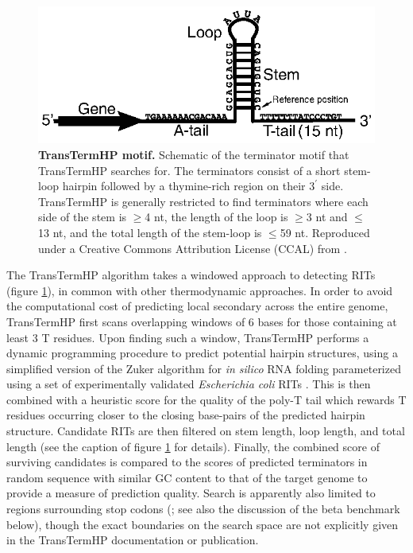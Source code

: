 \begin{figure}[htp]
\begin{center}
\includegraphics[width=14cm]{transterm}
\caption[TransTermHP motif]{\textbf{TransTermHP motif.} Schematic of the terminator motif that TransTermHP searches for. The terminators consist of a short stem-loop hairpin followed by a thymine-rich region on their $3^\prime$ side. TransTermHP is generally restricted to find terminators where each side of the stem is $\ge$4 nt, the length of the loop is $\ge$3 nt and $\le$13 nt, and the total length of the stem-loop is $\le$59 nt. Reproduced under a Creative Commons Attribution License (CCAL) from \textcite{Kingsford2007}.
} 
\label{fig:transterm}
\end{center}
\end{figure}

The TransTermHP algorithm takes a windowed approach to detecting RITs (figure \ref{fig:transterm}), in common with other thermodynamic approaches. In order to avoid the computational cost of predicting local secondary across the entire genome, TransTermHP first scans overlapping windows of 6 bases for those containing at least 3 T residues. Upon finding such a window, TransTermHP performs a dynamic programming procedure to predict potential hairpin structures, using a simplified version of the Zuker algorithm \parencite{Zuker1981} for {\it in silico} RNA folding parameterized using a set of experimentally validated {\it Escherichia coli} RITs \parencite{Ermolaeva2000}. This is then combined with a heuristic score for the quality of the poly-T tail \parencite{Carafa1990} which rewards T residues occurring closer to the closing base-pairs of the predicted hairpin structure. Candidate RITs are then filtered on stem length, loop length, and total length (see the caption of figure \ref{fig:transterm} for details). Finally, the combined score of surviving candidates is compared to the scores of predicted terminators in random sequence with similar GC content to that of the target genome to provide a measure of prediction quality. Search is apparently also limited to regions surrounding stop codons (\cite{Kingsford2007}; see also the discussion of the beta benchmark below), though the exact boundaries on the search space are not explicitly given in the TransTermHP documentation or publication.

